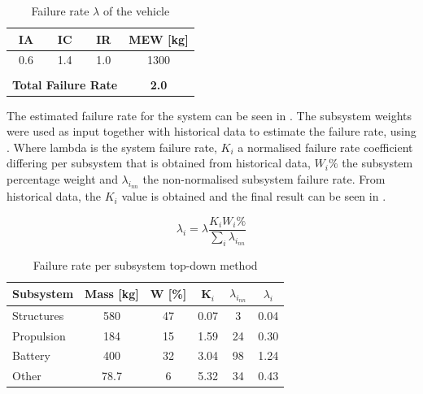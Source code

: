 \begin{table}[H]
    \centering
    \begin{tabular}{cccc}
        \toprule
        \textbf{IA} & \textbf{IC} & \textbf{IR} & \textbf{MEW [kg]} \\
        \midrule
        0.6 & 1.4 & 1.0 & 1300 \\
        \midrule
        \multicolumn{4}{c}{} \\ %
        \multicolumn{3}{r|}{\textbf{Total Failure Rate}} & \textbf{2.0} \\
        \bottomrule
    \end{tabular}
    \caption{Failure rate $\lambda$ of the vehicle}
    \label{tab:failure_rate}
\end{table}
The estimated failure rate for the system can be seen in .
 The subsystem weights were used as input together with historical data to estimate the failure rate, using .
Where lambda is the system failure rate, $K_{i}$ a normalised failure rate coefficient differing per subsystem that is obtained from historical data, $W_{i}\%$ the subsystem percentage weight and $\lambda_{i_{nn}}$ the non-normalised subsystem failure rate.
From historical data, the $K_{i}$ value is obtained \cite{giovingo2019rams} and the final result can be seen in .

\begin{equation}
\label{eq:li}
    \lambda_{i} = \lambda \frac{K_{i} W_{i}\%}{\sum_{i}\lambda_{i_{nn}}}
\end{equation}

\begin{table}[H]
\centering
\caption{Failure rate per subsystem top-down method}
\begin{tabular}{l|S[table-format=3.1]S[table-format=2]S[table-format=1.2]S[table-format=2]S[table-format=1.2]}
\toprule
\textbf{Subsystem} & \textbf{Mass [kg]} & \textbf{W [\%]} & \textbf{K$_i$} & \textbf{$\lambda_{i_{nn}}$} & \textbf{$\lambda_i$} \\ \hline

Structures & 580 & 47 & 0.07 & 3 & 0.04 \\ 
Propulsion & 184 & 15 & 1.59 & 24 & 0.30 \\ 
Battery & 400 & 32 & 3.04 & 98 & 1.24 \\ 
Other & 78.7 & 6 & 5.32 & 34 & 0.43 \\ \bottomrule
\end{tabular}
\label{tab:subsystemfailurerate}
\end{table}

